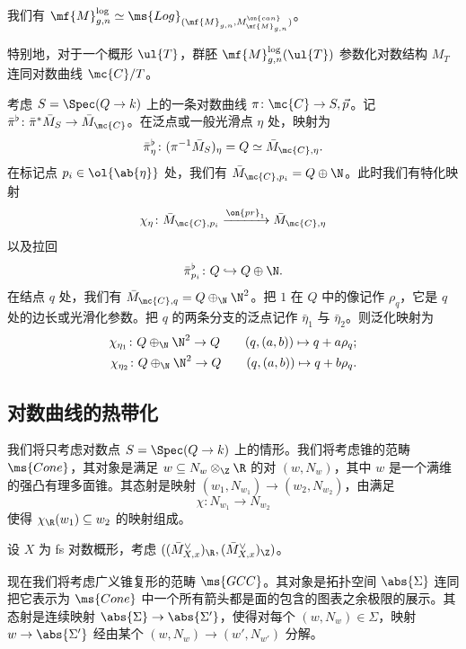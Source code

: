 \begin{prop}
    我们有 \(\mf{M}_{g,n}^{\log} \simeq \ms{Log}_{(\mf{M}_{g,n}, M_{\mf{M}_{g,n}}^{\on{can}})}\)。
\end{prop}

特别地，对于一个概形 \(\ul{T}\)，群胚 \(\mf{M}_{g,n}^{\log}(\ul{T})\) 参数化对数结构 \(M_T\) 连同对数曲线 \(\mc{C} / T\)。

考虑 \(S = \Spec (Q \to k)\) 上的一条对数曲线 \(\pi \colon \mc{C} \to S, \vec{p}\)。记 \(\bar{\pi}^{\flat} \colon \bar{\pi}^* \bar{M}_S \to \bar{M}_{\mc{C}}\)。在泛点或一般光滑点 \(\eta\) 处，映射为
\[ \bar{\pi}_{\eta}^{\flat} \colon (\pi^{-1} \bar{M}_S)_{\eta} = Q \simeq \bar{M}_{\mc{C}, \eta}. \]
在标记点 \(p_i \in \ol{\ab\{\eta\}}\) 处，我们有 \(\bar{M}_{\mc{C}, p_i} = Q \oplus \N\)。此时我们有特化映射
\[ \chi_{\eta} \colon \bar{M}_{\mc{C}, p_i} \xrightarrow{\on{pr}_1} \bar{M}_{\mc{C}, \eta} \]
以及拉回
\[ \bar{\pi}_{p_i}^{\flat} \colon Q \hookrightarrow Q \oplus \N. \]
在结点 \(q\) 处，我们有 \(\bar{M}_{\mc{C}, q} = Q \oplus_{\N} \N^2\)。把 \(1\) 在 \(Q\) 中的像记作 \(\rho_q\)，它是 \(q\) 处的边长或光滑化参数。把 \(q\) 的两条分支的泛点记作 \(\bar{\eta}_1\) 与 \(\bar{\eta}_2\)。则泛化映射为
\begin{align*}
    \chi_{\eta_1} \colon Q \oplus_{\N} \N^2 \to Q \qquad (q, (a,b)) \mapsto q + a \rho_q ;\\
    \chi_{\eta_2} \colon Q \oplus_{\N} \N^2 \to Q \qquad (q, (a,b)) \mapsto q + b \rho_q .
\end{align*}

\subsection{对数曲线的热带化}%
\label{sub:Tropicalization of log curves}

我们将只考虑对数点 \(S = \Spec(Q \to k)\) 上的情形。我们将考虑锥的范畴 \(\ms{Cone}\)，其对象是满足 \(w \subseteq N_w \otimes_{\Z} \R\) 的对 \((w, N_w)\)，其中 \(w\) 是一个满维的强凸有理多面锥。其态射是映射 \((w_1, N_{w_1}) \to (w_2, N_{w_2})\)，由满足
\[ \chi \colon N_{w_1} \to N_{w_2} \]
使得 \(\chi_{\R}(w_1) \subseteq w_2\) 的映射组成。

\begin{exm}
    设 \(X\) 为 fs 对数概形，考虑 \(( (\bar{M}_{X,x}^{\vee})_{\R}, (\bar{M}_{X,x}^{\vee})_{\Z} )\)。
\end{exm}

现在我们将考虑广义锥复形的范畴 \(\ms{GCC}\)。其对象是拓扑空间 \(\abs{\Sigma}\) 连同把它表示为 \(\ms{Cone}\) 中一个所有箭头都是面的包含的图表之余极限的展示。其态射是连续映射 \(\abs{\Sigma} \to \abs{\Sigma'}\)，使得对每个 \((w, N_w) \in \Sigma\)，映射 \(w \to \abs{\Sigma'}\) 经由某个 \((w, N_w) \to (w', N_{w'})\) 分解。

